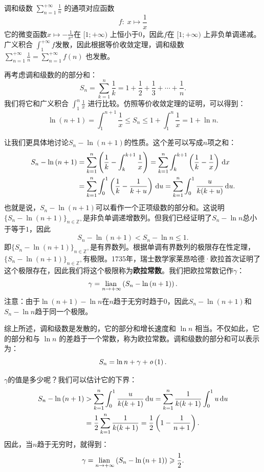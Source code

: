 \documentclass[12pt,UTF8,fontset=none]{ctexbook}
\begin{document}
\begin{so}
    调和级数 $\displaystyle\sum_{n=1}^{+\infty} \frac{1}{n}$ 的通项对应函数 
    $$f:\; x\mapsto \frac{1}{x}$$
    它的微变函数$x\mapsto -\frac{1}{x^2}$在 $[1;+\infty)$ 上恒小于$0$，因此$f$在 $[1;+\infty)$ 上非负单调递减。广义积合 $\int_1^{+\infty} f$发散，因此根据等价收敛定理，调和级数 $\displaystyle\sum_{n=1}^{+\infty} \frac{1}{n} = \sum_{n=1}^{+\infty} f(n)$ 也发散。
    
    再考虑调和级数的的部分和：
    \[
    S_n = \sum_{k=1}^{n} \frac{1}{k} = 1 + \frac{1}{2} + \frac{1}{3} + \cdots + \frac{1}{n}.
    \]
    我们将它和广义积合 $\int_1^{n} \frac{1}{x}$ 进行比较。仿照等价收敛定理的证明，可以得到：
    \[
    \ln{(n+1)} = \int_1^{n+1} \frac{1}{x} \leqslant S_n \leqslant 1 + \int_1^{n} \frac{1}{x} = 1 + \ln{n}.
    \]

    让我们更具体地讨论$S_n - \ln{(n+1)}$的性质。这个差可以写成$n$项之和：
    \begin{align*}       
        S_n - \ln{(n+1)} &= \sum_{k=1}^{n} \left(\frac{1}{k} - \int_k^{k+1} \frac{1}{x} \right) = \sum_{k=1}^{n} \int_k^{k+1} \left( \frac{1}{k} - \frac{1}{x} \right)\,\mathrm{d}x \\
        &= \sum_{k=1}^{n} \int_0^{1} \left( \frac{1}{k} - \frac{1}{k + u} \right)\,\mathrm{d}u = \sum_{k=1}^{n} \int_0^{1} \frac{u}{k(k + u)}\,\mathrm{d}u. 
    \end{align*}
    也就是说，$S_n - \ln{(n+1)}$可以看作一个正项级数的部分和。这说明$\{S_n - \ln{(n+1)}\}_{n\in\mathbb{Z}^+}$是非负单调递增数列。但我们已经证明了$S_n - \ln{n}$总小于等于$1$，因此
    $$S_n - \ln{(n+1)} < S_n - \ln{n} \leqslant 1.$$
    即$\{S_n - \ln{(n+1)}\}_{n\in\mathbb{Z}^+}$是有界数列。根据单调有界数列的极限存在性定理，$\{S_n - \ln{(n+1)}\}_{n\in\mathbb{Z}^+}$有极限。1735年，瑞士数学家莱昂哈德·欧拉首次证明了这个极限存在，因此我们将这个极限称为\textbf{欧拉常数}。我们把欧拉常数记作$\gamma$：
    $$\gamma = \underset{n\to+\infty}{\operatorname{lian}\,} \left( S_n - \ln{(n+1)} \right) .$$
    注意：由于$\ln{(n+1)} - \ln{n}$在$n$趋于无穷时趋于$0$，因此$S_n - \ln{(n+1)}$和$S_n - \ln{n}$趋于同一个极限。

    综上所述，调和级数是发散的，它的部分和增长速度和 $\ln{n}$ 相当。不仅如此，它的部分和与 $\ln{n}$ 的差趋于一个常数，称为欧拉常数。调和级数的部分和可以表示为：
    $$ S_n = \ln{n} + \gamma + \mathit{o}\left(1\right). $$

    $\gamma$的值是多少呢？我们可以估计它的下界：
    \begin{align*}       
        S_n - \ln{(n+1)} &> \sum_{k=1}^{n} \int_0^{1} \frac{u}{k(k + 1)}\,\mathrm{d}u = \sum_{k=1}^{n} \frac{1}{k(k + 1)} \int_0^{1} u\,\mathrm{d}u \\
        &= \frac{1}{2} \sum_{k=1}^{n} \frac{1}{k(k + 1)} = \frac{1}{2} \left( 1 - \frac{1}{n+1} \right).
    \end{align*}
    因此，当$n$趋于无穷时，就得到：
    $$ \gamma = \underset{n\to+\infty}{\operatorname{lian}\,} \left( S_n - \ln{(n+1)} \right) \geqslant \frac{1}{2}. $$
    

\end{so}
\end{document}
